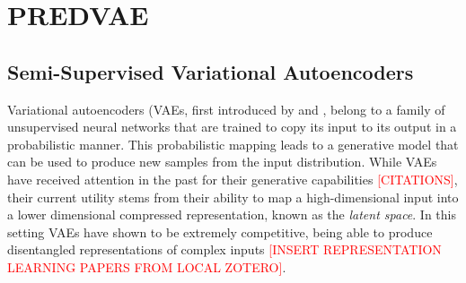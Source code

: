 \section{PREDVAE}
\label{sec:methods}





\subsection{Semi-Supervised Variational Autoencoders}
\label{subsec:ssvae}

Variational autoencoders (VAEs, first introduced by \cite{kingmaAutoEncodingVariationalBayes2022} and \cite{rezendeStochasticBackpropagationApproximate2014}, belong to a family of unsupervised neural networks that are trained to copy its input to its output in a probabilistic manner. This probabilistic mapping leads to a generative model that can be used to produce new samples from the input distribution. While VAEs have received attention in the past for their generative capabilities \textcolor{red}{[CITATIONS]}, their current utility stems from their ability to map a high-dimensional input into a lower dimensional compressed representation, known as the \textit{latent space}. In this setting VAEs have shown to be extremely competitive, being able to produce disentangled representations of complex inputs \textcolor{red}{[INSERT REPRESENTATION LEARNING PAPERS FROM LOCAL ZOTERO]}. 

